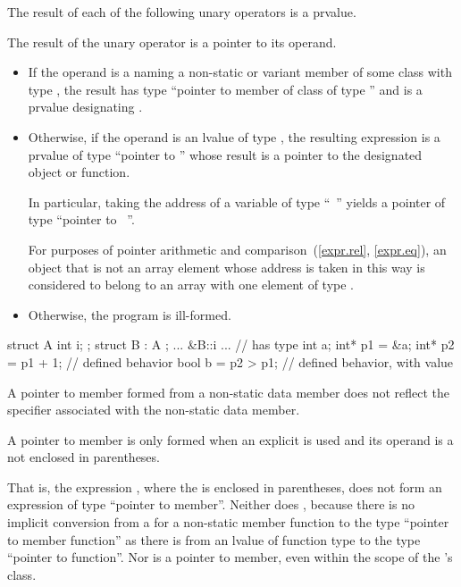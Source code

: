 \pnum
The result of each of the following unary operators is a prvalue.

\pnum
{}%
%
The result of the unary \tcode{\&} operator is a pointer to its operand.
\begin{itemize}
\item
If the operand is a  naming a non-static or variant member 
of some class  with type , the result has type ``pointer to member
of class  of type '' and is a prvalue designating .
\item
Otherwise, if the operand is an lvalue of type ,
the resulting expression is a prvalue of type ``pointer to ''
whose result is a pointer to the designated object or function.
\begin{note}
In particular, taking the address of a variable of type ``\cv{}~''
yields a pointer of type ``pointer to \cv{}~''.
\end{note}
For purposes of pointer arithmetic and
comparison~(\ref{expr.rel}, \ref{expr.eq}),
an object that is not an array element whose
address is taken in this way is considered to belong to an array with one
element of type .
\item
Otherwise, the program is ill-formed.
\end{itemize}
\begin{example}
\begin{codeblock}
struct A { int i; };
struct B : A { };
... &B::i ...       // has type 
int a;
int* p1 = &a;
int* p2 = p1 + 1;   // defined behavior
bool b = p2 > p1;   // defined behavior, with value 
\end{codeblock}
\end{example}
\begin{note}
A pointer to member formed from a  non-static data
member does not reflect the  specifier
associated with the non-static data member.
\end{note}

\pnum
A pointer to member is only formed when an explicit \tcode{\&} is used
and its operand is a  not enclosed in
parentheses.
\begin{note}
That is, the expression , where the
 is enclosed in parentheses, does not form an
expression of type ``pointer to member''. Neither does
, because there is no implicit conversion from a
 for a non-static member function to the type
``pointer to member function'' as there is from an lvalue of function
type to the type ``pointer to function''. Nor is
 a pointer to member, even within the scope of
the 's class.
\end{note}

